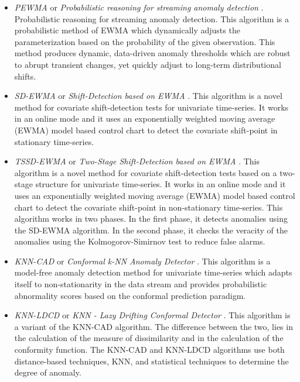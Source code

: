 \documentclass[a4paper]{article}\usepackage[]{graphicx}\usepackage[]{color}
\begin{document}
\begin{itemize}
\item \emph{PEWMA} or \emph{Probabilistic reasoning for streaming anomaly detection} \cite{pewma}. Probabilistic reasoning for streaming anomaly detection. This algorithm is a probabilistic method of EWMA which dynamically adjusts the parameterization based on the probability of the given observation. This method produces dynamic, data-driven anomaly thresholds which are robust to abrupt transient changes, yet quickly adjust to long-term distributional shifts.

\item \emph{SD-EWMA} or \emph{Shift-Detection based on EWMA} \cite{Raza}. This algorithm is a novel method for covariate shift-detection tests for univariate time-series. It works in an online mode and it uses an exponentially weighted moving average (EWMA) model based control chart to detect the covariate shift-point in stationary time-series.

\item \emph{TSSD-EWMA} or \emph{Two-Stage Shift-Detection based on EWMA} \cite{Raza}. This algorithm is a novel method for covariate shift-detection tests based on a two-stage structure for univariate time-series. It works in an online mode and it uses an exponentially weighted moving average (EWMA) model based control chart to detect the covariate shift-point in non-stationary time-series. This algorithm works in two phases. In the first phase, it detects anomalies using the SD-EWMA algorithm. In the second phase, it checks the veracity of the anomalies using the Kolmogorov-Simirnov test to reduce false alarms.

\item \emph{KNN-CAD} or \emph{Conformal k-NN Anomaly Detector} \cite{2016arXiv160804585B}. This algorithm is a model-free anomaly detection method for univariate time-series which adapts itself to non-stationarity in the data stream and provides probabilistic abnormality scores based on the conformal prediction paradigm.

\item \emph{KNN-LDCD} or \emph{KNN - Lazy Drifting Conformal Detector}  \cite{2017arXiv170603412I}. This algorithm is a variant of the KNN-CAD algorithm. The difference between the two, lies in the calculation of the measure of dissimilarity and in the calculation of the conformity function. The KNN-CAD and KNN-LDCD algorithms use both distance-based techniques, KNN, and statistical techniques to determine the degree of anomaly.
\end{itemize}
\end{document}
